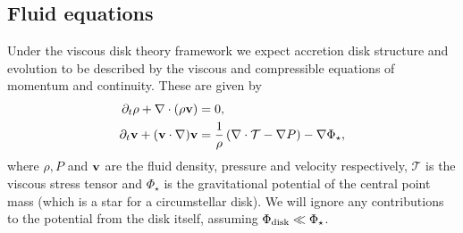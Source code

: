 \subsection{Fluid equations} \label{sec:fluid_eqns}

Under the viscous disk theory framework we expect accretion disk structure and evolution to be described by the viscous and compressible equations of momentum and continuity.
These are given by \citep[e.g.][]{landau1959}
\begin{align}
    \partial_t \rho + \nabla \cdot (\rho \mathbf{v}) &= 0, \label{eq:fluid_cont} \\
    \partial_t \mathbf{v} + (\mathbf{v} \cdot \nabla) \mathbf{v} &= \frac{1}{\rho} \left( \nabla \cdot \mathcal{T} - \nabla P \right) - \nabla \Phi_\star, \label{eq:fluid_mom}
\end{align}
where $\rho, P$ and $\mathbf{v}$ are the fluid density, pressure and velocity respectively, $\mathcal{T}$ is the viscous stress tensor and $\Phi_\star$ is the gravitational potential of the central point mass (which is a star for a circumstellar disk).
We will ignore any contributions to the potential from the disk itself, assuming $\Phi_{\rm disk} \ll \Phi_\star$.


